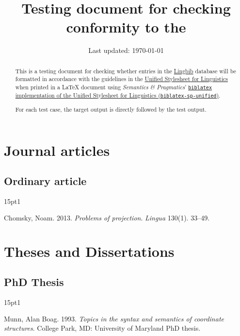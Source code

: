 \documentclass{article}
\title{Testing document for checking conformity to the \UnifiedStyleSheet}
\author{\Lingbib}
\date{Last updated: \today}
\newcommand*{\Lingbib}{\href{http://lingbib.org/}{Lingbib}}
\newcommand*{\SP}{\emph{Semantics \& Pragmatics}}
\newcommand*{\UnifiedStyleSheet}{\href{http://celxj.org/downloads/UnifiedStyleSheet.pdf}{Unified Stylesheet for Linguistics}}
\newcommand*{\Package}[1]{\texttt{#1}}
\newcommand*{\bibentrytest}[2]{
	\begin{hangparas}{15pt}{1}
	#1
	\end{hangparas}
	
	\nocite{#2}
	\printbibliography[heading=none]
}
\begin{document}
\maketitle

\begin{abstract}
This is a testing document for checking whether entries in the \Lingbib{} database will be formatted in accordance with the guidelines in the \UnifiedStyleSheet{} when printed in a \LaTeX{} document using  \SP' \href{https://github.com/semprag/biblatex-sp-unified/}{\Package{biblatex} implementation of the Unified Stylesheet for Linguistics (\Package{biblatex-sp-unified})}.

For each test case, the target output is directly followed by the test output.
\end{abstract}



\section{Journal articles}

\subsection{Ordinary article}

\bibentrytest{
	Chomsky, Noam. 2013. \textit{Problems of projection}. \textit{Lingua} 130(1). 33--49.
	}{
	chomsky2013:projection
}



\section{Theses and Dissertations}

\subsection{PhD Thesis}

\bibentrytest{
	Munn, Alan Boag. 1993. \textit{Topics in the syntax and semantics of coordinate structures}. College Park, MD: University of Maryland PhD thesis.
}{
munn1993:coordinate
}
\end{document}

